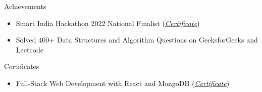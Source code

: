 \documentclass{resume} %
\begin{document}







\begin{rSection}{Achievements}
\begin{itemize}
   \item {Smart India Hackathon 2022 National Finalist} {\normalfont (\href{https://drive.google.com/file/d/1No-u1sUaclG-nf7_Gtym5JDEz1ydyRSL/view?usp=sharing}{\emph{Certificate}})}
   
    \item { {\normalfont Solved} 400+ {\normalfont Data Structures and Algorithm Questions on} GeeksforGeeks {\normalfont and} Leetcode}
\end{itemize}
\end{rSection}





\begin{rSection}{Certificates}
\begin{itemize}
   \item {Full-Stack Web Development with React and MongoDB} {\normalfont (\href{https://www.udemy.com/certificate/UC-156daafe-cfd7-4b60-82be-4d995f308dbc/}{\emph{Certificate}})}
   \\
\end{itemize}



\end{rSection}



\end{document}
